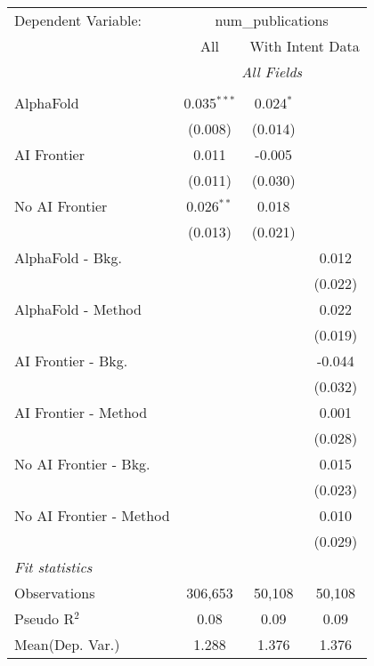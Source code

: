 \begingroup
\centering
\begin{tabular}{lccc}
   \tabularnewline \midrule \midrule
   Dependent Variable: & \multicolumn{3}{c}{num\_publications}\\
 & \multicolumn{1}{c}{All} & \multicolumn{2}{c}{With Intent Data} \\
\cmidrule(lr){2-2} \cmidrule(lr){3-4}
 & \multicolumn{3}{c}{\textit{All Fields}} \\ \\
   AlphaFold               & 0.035$^{***}$ & 0.024$^{*}$ &   \\   
                           & (0.008)       & (0.014)     &   \\   
   AI Frontier             & 0.011         & -0.005      &   \\   
                           & (0.011)       & (0.030)     &   \\   
   No AI Frontier          & 0.026$^{**}$  & 0.018       &   \\   
                           & (0.013)       & (0.021)     &   \\   
   AlphaFold - Bkg.        &               &             & 0.012\\   
                           &               &             & (0.022)\\   
   AlphaFold - Method      &               &             & 0.022\\   
                           &               &             & (0.019)\\   
   AI Frontier - Bkg.      &               &             & -0.044\\   
                           &               &             & (0.032)\\   
   AI Frontier - Method    &               &             & 0.001\\   
                           &               &             & (0.028)\\   
   No AI Frontier - Bkg.   &               &             & 0.015\\   
                           &               &             & (0.023)\\   
   No AI Frontier - Method &               &             & 0.010\\   
                           &               &             & (0.029)\\   
   \midrule
   \emph{Fit statistics}\\
   Observations            & 306,653       & 50,108      & 50,108\\  
   Pseudo R$^2$            & 0.08          & 0.09        & 0.09\\  
Mean(Dep. Var.) & 1.288 & 1.376 & 1.376 \\
   

\end{tabular}
